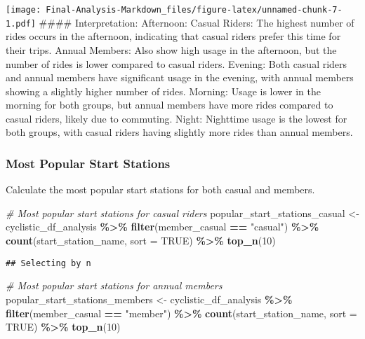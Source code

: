 \documentclass[
]{article}
\newenvironment{Shaded}{\begin{snugshade}}{\end{snugshade}}
\newcommand{\AttributeTok}[1]{\textcolor[rgb]{0.13,0.29,0.53}{#1}}
\newcommand{\CommentTok}[1]{\textcolor[rgb]{0.56,0.35,0.01}{\textit{#1}}}
\newcommand{\ConstantTok}[1]{\textcolor[rgb]{0.56,0.35,0.01}{#1}}
\newcommand{\DecValTok}[1]{\textcolor[rgb]{0.00,0.00,0.81}{#1}}
\newcommand{\FunctionTok}[1]{\textcolor[rgb]{0.13,0.29,0.53}{\textbf{#1}}}
\newcommand{\NormalTok}[1]{#1}
\newcommand{\OtherTok}[1]{\textcolor[rgb]{0.56,0.35,0.01}{#1}}
\newcommand{\SpecialCharTok}[1]{\textcolor[rgb]{0.81,0.36,0.00}{\textbf{#1}}}
\newcommand{\StringTok}[1]{\textcolor[rgb]{0.31,0.60,0.02}{#1}}
\begin{document}
\texttt{[image: Final-Analysis-Markdown\_files/figure-latex/unnamed-chunk-7-1.pdf]}
\#\#\#\# Interpretation: Afternoon: Casual Riders: The highest number of
rides occurs in the afternoon, indicating that casual riders prefer this
time for their trips. Annual Members: Also show high usage in the
afternoon, but the number of rides is lower compared to casual riders.
Evening: Both casual riders and annual members have significant usage in
the evening, with annual members showing a slightly higher number of
rides. Morning: Usage is lower in the morning for both groups, but
annual members have more rides compared to casual riders, likely due to
commuting. Night: Nighttime usage is the lowest for both groups, with
casual riders having slightly more rides than annual members.

\subsubsection{Most Popular Start
Stations}\label{most-popular-start-stations}

Calculate the most popular start stations for both casual and members.

\begin{Shaded}
\begin{Highlighting}[]
\CommentTok{\# Most popular start stations for casual riders}
\NormalTok{popular\_start\_stations\_casual }\OtherTok{\textless{}{-}}\NormalTok{ cyclistic\_df\_analysis }\SpecialCharTok{\%\textgreater{}\%}
  \FunctionTok{filter}\NormalTok{(member\_casual }\SpecialCharTok{==} \StringTok{"casual"}\NormalTok{) }\SpecialCharTok{\%\textgreater{}\%}
  \FunctionTok{count}\NormalTok{(start\_station\_name, }\AttributeTok{sort =} \ConstantTok{TRUE}\NormalTok{) }\SpecialCharTok{\%\textgreater{}\%}
  \FunctionTok{top\_n}\NormalTok{(}\DecValTok{10}\NormalTok{)}
\end{Highlighting}
\end{Shaded}

\begin{verbatim}
## Selecting by n
\end{verbatim}

\begin{Shaded}
\begin{Highlighting}[]
\CommentTok{\# Most popular start stations for annual members}
\NormalTok{popular\_start\_stations\_members }\OtherTok{\textless{}{-}}\NormalTok{ cyclistic\_df\_analysis }\SpecialCharTok{\%\textgreater{}\%}
  \FunctionTok{filter}\NormalTok{(member\_casual }\SpecialCharTok{==} \StringTok{"member"}\NormalTok{) }\SpecialCharTok{\%\textgreater{}\%}
  \FunctionTok{count}\NormalTok{(start\_station\_name, }\AttributeTok{sort =} \ConstantTok{TRUE}\NormalTok{) }\SpecialCharTok{\%\textgreater{}\%}
  \FunctionTok{top\_n}\NormalTok{(}\DecValTok{10}\NormalTok{)}
\end{Highlighting}
\end{Shaded}
\end{document}

